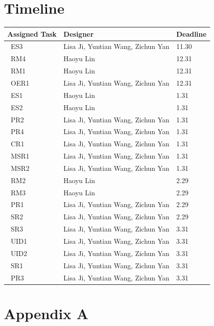 \documentclass[12pt]{article}
\begin{document}
\section{Timeline}
\noindent \begin{tabular}{l l l}
    \toprule
    \textbf{Assigned Task}    & \textbf{Designer} & \textbf{Deadline} \\
    \midrule
    \ ES3        & Lisa Ji,  Yuntian Wang, Zichun Yan      & 11.30  \\
    \ RM4        & Haoyu Lin           & 12.31 \\
    \ RM1       &  Haoyu Lin         & 12.31  \\
    \ OER1     & Lisa Ji,  Yuntian Wang, Zichun Yan    & 12.31   \\
    \ ES1       & Haoyu Lin         & 1.31     \\
    \ ES2         & Haoyu Lin          &1.31 \\
    \ PR2         & Lisa Ji,  Yuntian Wang, Zichun Yan        &1.31 \\
    \ PR4         & Lisa Ji,  Yuntian Wang, Zichun Yan        &1.31 \\
    \ CR1         & Lisa Ji,  Yuntian Wang, Zichun Yan        &1.31 \\
    \ MSR1        & Lisa Ji,  Yuntian Wang, Zichun Yan          &1.31 \\
    \ MSR2       & Lisa Ji,  Yuntian Wang, Zichun Yan         &1.31 \\
    \ RM2        & Haoyu Lin         & 2.29   \\
    \ RM3       & Haoyu Lin          & 2.29    \\
    \ PR1        & Lisa Ji,  Yuntian Wang, Zichun Yan         & 2.29   \\
    \ SR2       & Lisa Ji,  Yuntian Wang, Zichun Yan        & 2.29    \\
    \ SR3        & Lisa Ji,  Yuntian Wang, Zichun Yan      &3.31 \\
    \ UID1        & Lisa Ji,  Yuntian Wang, Zichun Yan      &3.31 \\
    \ UID2        & Lisa Ji,  Yuntian Wang, Zichun Yan     &3.31 \\
    \ SR1       & Lisa Ji,  Yuntian Wang,  Zichun Yan       &3.31 \\
    \ PR3       & Lisa Ji,  Yuntian Wang, Zichun Yan        &3.31 \\
    \bottomrule
\end{tabular}

\newpage
\section{Appendix A}
\end{document}
